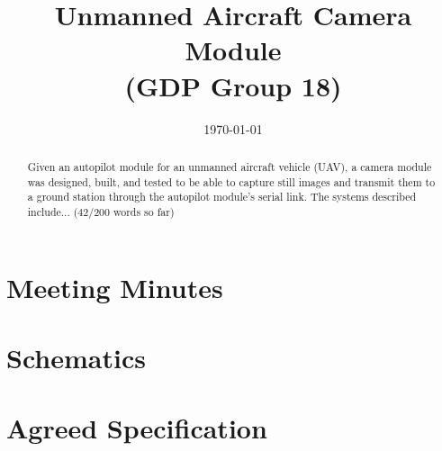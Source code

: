 \documentclass[oneside]{ecsgdp}         %
\begin{document}
\frontmatter
\title      {Unmanned Aircraft Camera Module \\(GDP Group 18)}
\date       {\today}
\subject    {ELEC6050 Group Design Project}
\maketitle
\begin{abstract}
Given an autopilot module for an unmanned aircraft vehicle (UAV), a camera module was designed, built, and tested to be able to capture still images and transmit them to a ground station through the autopilot module's serial link. The systems described include... (42/200 words so far)
\end{abstract}
\tableofcontents
\listoffigures
\listoftables
\lstlistoflistings
{}
\mainmatter



\newpage

\newpage

\newpage

\newpage

\newpage

\newpage

\newpage

\newpage

\newpage

\newpage

\newpage

\newpage

\newpage

\newpage





\newpage

\appendix
\chapter{Meeting Minutes}

\newpage

\chapter{Schematics}

\newpage

\chapter{Agreed Specification}

\newpage

\backmatter



\end{document}
